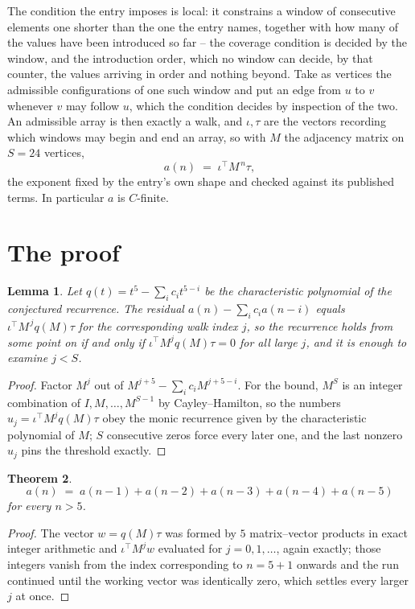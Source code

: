 \documentclass[11pt,a4paper]{article}
\theoremstyle{plain}
\newtheorem{theorem}{Theorem}
\newtheorem{lemma}[theorem]{Lemma}
\theoremstyle{definition}
\begin{document}
The condition the entry imposes is local: it constrains a window of consecutive elements one shorter than the one the entry names, together with how many of the values have been introduced so far -- the coverage condition is decided by the window, and the introduction order, which no window can decide, by that counter, the values arriving in order and nothing beyond. Take as vertices the admissible configurations of one such window and put an edge from $u$ to $v$ whenever $v$ may follow $u$, which the condition decides by inspection of the two.
An admissible array is then exactly a walk, and $\iota,\tau$ are the vectors recording which windows may begin and end an array, so with $M$ the adjacency matrix on $S=24$ vertices,
\[
a(n)\;=\;\iota^{\!\top}M^{\,n}\tau ,
\]
the exponent fixed by the entry's own shape and checked against its published terms. In
particular $a$ is $C$-finite.

\section{The proof}

\begin{lemma}\label{lem:crit}
Let $q(t)=t^{5}-\sum_i c_it^{5-i}$ be the characteristic polynomial of the
conjectured recurrence. The residual $a(n)-\sum_ic_ia(n-i)$ equals
$\iota^{\!\top}M^{\,j}q(M)\tau$ for the corresponding walk index $j$, so the recurrence
holds from some point on if and only if $\iota^{\!\top}M^{j}q(M)\tau=0$ for all large $j$,
and it is enough to examine $j<S$.
\end{lemma}

\begin{proof}
Factor $M^{j}$ out of $M^{j+5}-\sum_ic_iM^{j+5-i}$. For the bound, $M^{S}$
is an integer combination of $I,M,\dots,M^{S-1}$ by Cayley--Hamilton, so the numbers
$u_j=\iota^{\!\top}M^{j}q(M)\tau$ obey the monic recurrence given by the characteristic
polynomial of $M$; $S$ consecutive zeros force every later one, and the last nonzero $u_j$
pins the threshold exactly.
\end{proof}

\begin{theorem}
\[
a(n)\;=\;a(n-1) + a(n-2) + a(n-3) + a(n-4) + a(n-5)
\]
for every $n>5$.
\end{theorem}

\begin{proof}
The vector $w=q(M)\tau$ was formed by $5$ matrix--vector products in exact integer
arithmetic and $\iota^{\!\top}M^{j}w$ evaluated for $j=0,1,\dots$, again exactly; those
integers vanish from the index corresponding to $n=5+1$ onwards and the run continued
until the working vector was identically zero, which settles every larger $j$ at once.
\end{proof}
\end{document}
